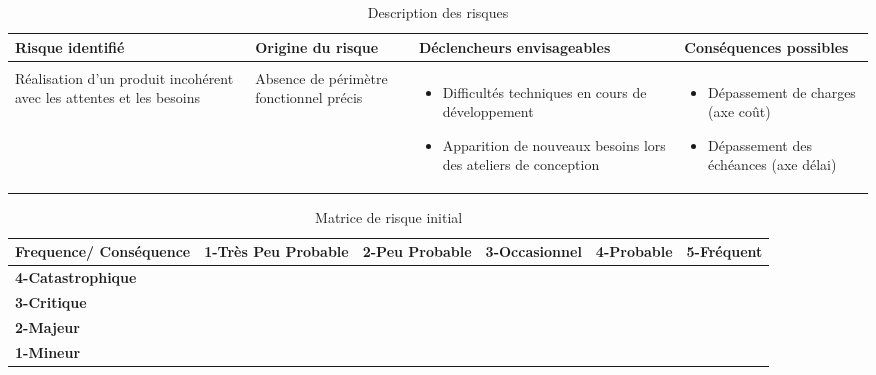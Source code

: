 \documentclass[12pt]{article}
\begin{document}
\begin{landscape}
\begin{table}[H]
\scriptsize
\caption{Description des risques}
\begin{tabular}{p{}p{3.5cm}p{6.75cm} p{6.75cm}}
\hline Risque identifié & \bf Origine du risque & \bf Déclencheurs envisageables & \bf Conséquences possibles \\
\hline
&&&\\
Réalisation d’un produit incohérent avec les attentes et les besoins & Absence de périmètre fonctionnel précis\cellcolor{blue!50} & 
 \begin{itemize}
\item Difficultés techniques en cours de développement
 			\item Apparition de nouveaux besoins lors des ateliers de conception
 			\cellcolor{green!50}
 \end{itemize} & 
 \begin{itemize}
 	\item Dépassement de charges (axe coût)
 	\item Dépassement des échéances (axe délai)
 \end{itemize}
 \cellcolor{red!50}\\


\hline
\end{tabular}
\end{table}
\end{landscape}


\begin{table}[H]
\centering
\scriptsize
\caption{Matrice de risque initial}
\begin{tabular}{|p{2cm}|p{2cm}|p{2cm}| p{2cm} |p{2cm}| p{2cm}|}
\hline \bf Frequence/ Conséquence & \bf 1-Très Peu Probable & \bf 2-Peu Probable & \bf 3-Occasionnel & \bf 4-Probable & \bf 5-Fréquent\\ [10pt]
\hline \bf 4-Catastrophique & \cellcolor{yellow!50} & \cellcolor{red!50} & \cellcolor{red!50} & \cellcolor{red!50} &\cellcolor{red!50} \\ [10pt]
\hline \bf 3-Critique &\cellcolor{green!50} & \cellcolor{yellow!50} & \cellcolor{yellow!50} & \cellcolor{red!50} &\cellcolor{red!50} \\ [10pt]
\hline \bf 2-Majeur & \cellcolor{green!50} & \cellcolor{green!50} & \cellcolor{yellow!50} &\cellcolor{yellow!50} &\cellcolor{red!50} \\ [10pt]
\hline \bf 1-Mineur & \cellcolor{green!50} & \cellcolor{green!50} & \cellcolor{green!50} &\cellcolor{yellow!50} &\cellcolor{yellow!50} \\ [10pt]
\hline
\end{tabular} \\
\end{table}
\end{document}
